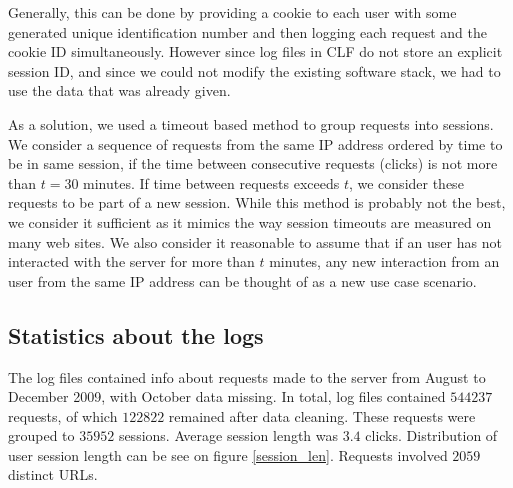 \documentclass[english,a4paper]{article}
\begin{document}
Generally, this can be done by providing a cookie to each user with some generated unique identification number and then logging each request and the cookie ID simultaneously. However since log files in CLF do not store an explicit session ID, and since we could not modify the existing software stack, we had to use the data that was already given.  

As a solution, we used a timeout based method to group requests into sessions. We consider a sequence of requests from the same IP address ordered by time to be in
same session, if the time between consecutive requests (clicks) is not more
than $t = 30$ minutes. If time between requests exceeds $t$, we
consider these requests to be part of a new session. While this method is
probably not the best, we consider it sufficient as it mimics the way session
timeouts are measured on many web sites. We also consider it reasonable to
assume that if an user has not interacted with the server for more than $t$
minutes, any new interaction from an user from the same IP address can be
thought of as a new use case scenario.










\subsection{Statistics about the logs} 
The log files contained info about requests made to the server from August to December 2009, with October data missing. In total, log files contained 
$544237$ requests, of which $122822$ remained after data cleaning. These requests were grouped to $35952$ sessions. Average session length was $3.4$ clicks. Distribution of user session length can be see on figure \ref{session_len}. Requests involved $2059$ distinct URLs. 
\end{document}
